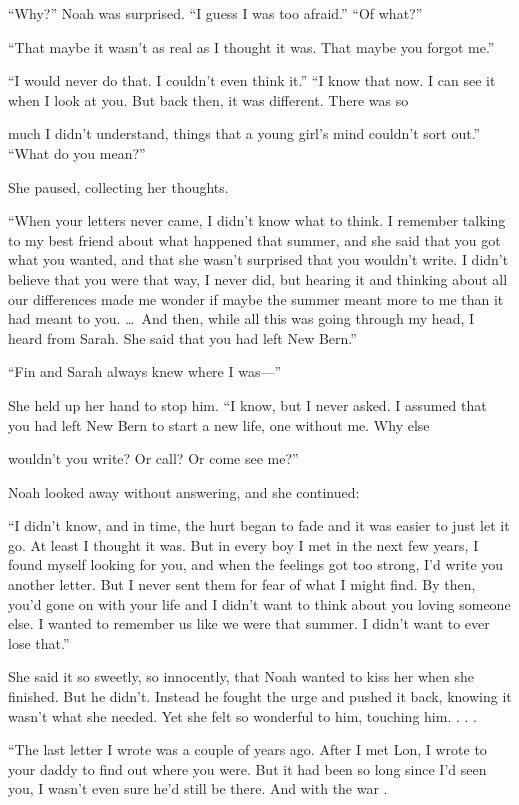 \documentclass[10pt, twoside, openright]{book}
\begin{document}
``Why?'' Noah was surprised. ``I guess I was too afraid.'' ``Of what?''


``That maybe it wasn't as real as I thought it was. That maybe you
forgot me.''

``I would never do that. I couldn't even think it.'' ``I know that now.
I can see it when I look at you. But back then, it was different. There
was so

much I didn't understand, things that a young girl's mind couldn't sort
out.'' ``What do you mean?''


She paused, collecting her thoughts.


``When your letters never came, I didn't know what to think. I remember
talking to my best friend about what happened that summer, and she said
that you got what you wanted, and that she wasn't surprised that you
wouldn't write. I didn't believe that you were that way, I never did,
but hearing it and thinking about all our differences made me wonder if
maybe the summer meant more to me than it had meant to you.   \dots\ And
then, while all this was going through my head, I heard from Sarah. She
said that you had left New Bern.''


``Fin and Sarah always knew where I was---''


She held up her hand to stop him. ``I know, but I never asked. I assumed
that you had left New Bern to start a new life, one without me. Why else

wouldn't you write? Or call? Or come see me?''


Noah looked away without answering, and she continued:


``I didn't know, and in time, the hurt began to fade and it was easier
to just let it go. At least I thought it was. But in every boy I met in
the next few years, I found myself looking for you, and when the
feelings got too strong, I'd write you another letter. But I never sent
them for fear of what I might find. By then, you'd gone on with your
life and I didn't want to think about you loving someone else. I wanted
to remember us like we were that summer. I didn't want to ever lose
that.''

She said it so sweetly, so innocently, that Noah wanted to kiss her when
she finished. But he didn't. Instead he fought the urge and pushed it
back, knowing it wasn't what she needed. Yet she felt so wonderful to
him, touching him. . . .

``The last letter I wrote was a couple of years ago. After I met Lon, I
wrote to your daddy to find out where you were. But it had been so long
since I'd seen you, I wasn't even sure he'd still be there. And with the
war .
\end{document}
